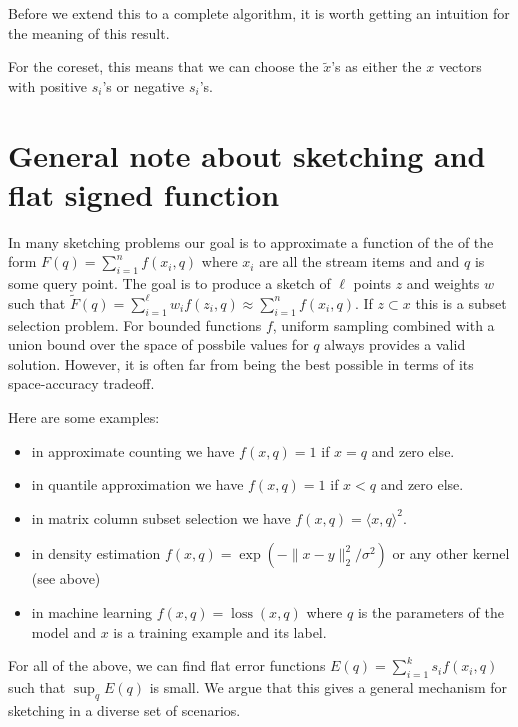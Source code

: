 \documentclass{article} %
\begin{document}
Before we extend this to a complete algorithm, it is worth getting an intuition for the meaning of this result.

For the coreset, this means that we can choose the $\tilde{x}$'s as either the $x$ vectors with positive $s_i$'s or negative $s_i$'s.




\section{General note about sketching and flat signed function}
In many sketching problems our goal is to approximate a function of the of the form $F(q) = \sum_{i=1}^{n} f(x_i, q)$ where $x_i$ are all the stream items and and $q$ is some query point. 
The goal is to produce a sketch of $\ell$ points $z$ and weights $w$ such that $\tilde F(q) = \sum_{i=1}^{\ell}w_i f(z_i,q) \approx \sum_{i=1}^{n} f(x_i, q)$. 
If $z \subset x$ this is a subset selection problem. 
For bounded functions $f$, uniform sampling combined with a union bound over the space of possbile values for $q$ always provides a valid solution.
However, it is often far from being the best possible in terms of its space-accuracy tradeoff. 

Here are some examples:
\begin{itemize}
\item in approximate counting we have $f(x, q) = 1$ if $x=q$ and zero else.
\item in quantile approximation we have $f(x, q) = 1$ if $x<q$ and zero else.
\item in matrix column subset selection we have $f(x, q) = \langle x,q \rangle ^2$.
\item in density estimation $f(x, q) = \exp(- \|x-y\|_2^2/\sigma^2)$ or any other kernel (see above)
\item in machine learning $f(x, q) = \operatorname{loss}(x,q)$ where $q$ is the parameters of the model and $x$ is a training example and its label.
\end{itemize}
For all of the above, we can find flat error functions $E(q) = \sum_{i=1}^{k} s_i f(x_i,q)$ such that $\sup_q E(q)$ is small. 
We argue that this gives a general mechanism for sketching in a diverse set of scenarios. 
\end{document}
